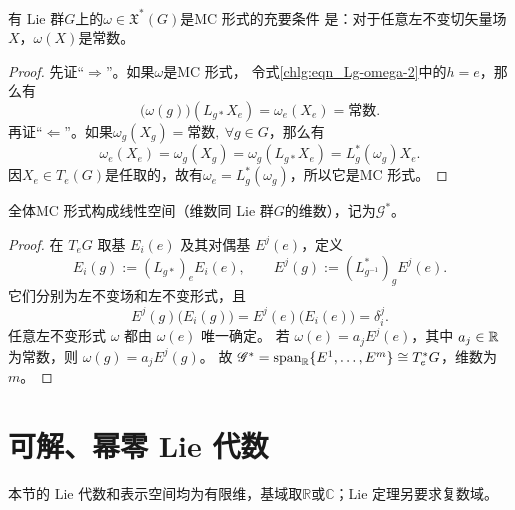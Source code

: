 \begin{theorem}
    有 Lie 群$G$上的$\omega\in \mathfrak{X}^*(G)$是MC 形式的充要条件
    是：对于任意左不变切矢量场$X$，$\omega(X)$是常数。
\end{theorem}
\begin{proof}
    先证“$\Rightarrow$”。如果$\omega$是MC 形式，
    令式\eqref{chlg:eqn_Lg-omega-2}中的$h=e$，那么有
    \begin{equation}
        \bigl(\omega(g)\bigr)(L_{g*}X_e)=\omega_e (X_e)=\text{常数}.
    \end{equation}
    再证“$\Leftarrow$”。如果$\omega_g (X_g)=\text{常数},\ \forall g\in G$，那么有
    \begin{equation}
        \omega_e (X_e) = \omega_g (X_g) =\omega_g (L_{g*}X_e) = L_g^* (\omega_g) X_e.
    \end{equation}
    因$X_e\in T_e(G)$是任取的，故有$\omega_e=L_g^* (\omega_g)$，所以它是MC 形式。
\end{proof}

\begin{theorem}
    全体MC 形式构成线性空间（维数同 Lie 群$G$的维数），记为$\mathscr{G}^*$。
\end{theorem}
\begin{proof}
    在 $T_eG$ 取基 $E_i(e)$ 及其对偶基 $E^j(e)$，定义
    \[
        E_i(g):=(L_{g*})_eE_i(e),\qquad
        E^j(g):=(L_{g^{-1}}^*)_gE^j(e).
    \]
    它们分别为左不变场和左不变形式，且
    \begin{equation}
        E^j(g)\bigl(E_i(g)\bigr)=E^j(e)\bigl(E_i(e)\bigr)=\delta^j_i.
    \end{equation}
    任意左不变形式 $\omega$ 都由 $\omega(e)$ 唯一确定。
    若 $\omega(e)=a_jE^j(e)$，其中 $a_j\in\mathbb{R}$ 为常数，则 $\omega(g)=a_jE^j(g)$。
    故 $\mathscr G^*=\operatorname{span}_{\mathbb{R}}\{E^1,\ldots,E^m\}\cong T_e^*G$，维数为 $m$。
\end{proof}

\section{可解、幂零 Lie 代数}\label{chlg:sec_sn}

本节的 Lie 代数和表示空间均为有限维，基域取$\mathbb R$或$\mathbb C$；Lie 定理另要求复数域。

